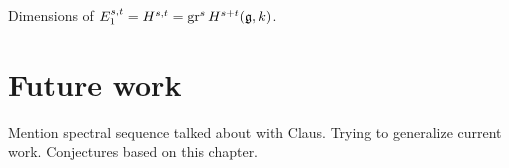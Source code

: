 \begin{table}[ht]
  \centering
  \caption[Graded cohomology dimensions for $I \subseteq \GL_{3}(\Z_{p})$]{Dimensions of $E_{1}^{s,t} = H^{s,t} = \operatorname{gr}^{s} H^{s+t}(\mathfrak{g},k)$.}
  \label{tab:graded-coh-dims-GL3}
\end{table}

\section{Future work}%
\label{sec:future}

Mention spectral sequence talked about with Claus. Trying to generalize current work. Conjectures based on this chapter.

